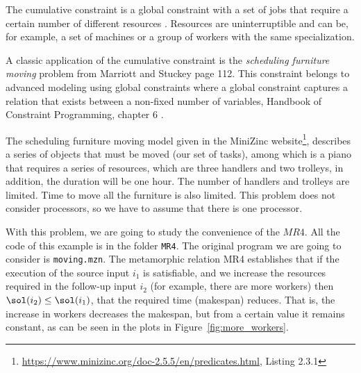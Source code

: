 The cumulative constraint is a global constraint with a set of jobs that require a certain number of different resources \cite{heinz2011explanations}.
Resources are uninterruptible and can be, for example, a set of machines or a group of workers with the same specialization.


A classic application of the cumulative constraint is the \textit{scheduling furniture moving} problem from Marriott and Stuckey \cite{marriott1998programming} page 112.
This constraint belongs to advanced modeling using global constraints \cite{Zhou2015} where
a global constraint captures a relation
that exists between a non-fixed number of variables, Handbook of Constraint Programming, chapter 6 \cite{GlobalConstraints}.



The scheduling furniture moving model given in the MiniZinc website\footnote{\url{https://www.minizinc.org/doc-2.5.5/en/predicates.html}, Listing 2.3.1},
describes a series of objects that must be moved (our set of tasks),
among which is a piano that requires a series of resources,
which are three handlers and two trolleys, in addition, the duration will be one hour.
The number of handlers and trolleys are limited.
Time to move all the furniture is also limited. This problem does not
consider processors, so we have to assume that there is one processor.

With this problem, we are going to study the convenience of the
$MR4$. All the code of this example is in the folder
\lstinline|MR4|.
The original program we are going to consider is
\lstinline|moving.mzn|.
The metamorphic relation MR4 establishes that if the execution of the
source input $i_{1}$ is satisfiable, and we increase the resources
required in the follow-up input \(i_{2}\) (for example, there are more
workers)
then $\sol(i_{2})\leq\sol(i_{1})$, that the required time (makespan) reduces.
That is, the increase in workers decreases the makespan,
but from a certain value it remains constant, as can be seen in the plots
in Figure~\ref{fig:more_workers}.

